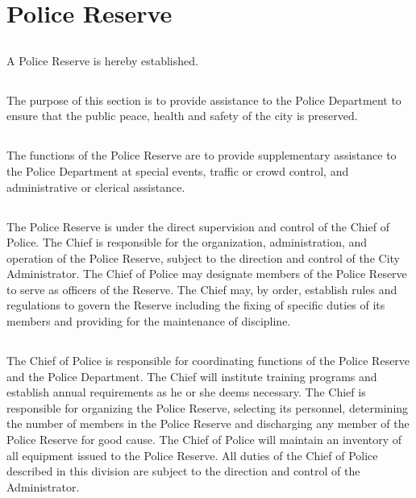 \section{Police Reserve}
\subsection{}
A Police Reserve is hereby established.
\subsection{}
The purpose of this section is to provide assistance to the Police Department to ensure that the public peace, health and safety of the city is preserved.
\subsection{}
The functions of the Police Reserve are to provide supplementary assistance to the Police Department at special events, traffic or crowd control, and administrative or clerical assistance.
\subsection{}
The Police Reserve is under the direct supervision and control of the Chief of Police.  The Chief is responsible for the organization, administration, and operation of the Police Reserve, subject to the direction and control of the City Administrator. The Chief of Police may designate members of the Police Reserve to serve as officers of the Reserve. The Chief may, by order, establish rules and regulations to govern the Reserve including the fixing of specific duties of its members and providing for the maintenance of discipline.
\subsection{}
The Chief of Police is responsible for coordinating functions of the Police Reserve and the Police Department. The Chief will institute training programs and establish annual requirements as he or she deems necessary. The Chief is responsible for organizing the Police Reserve, selecting its personnel, determining the number of members in the Police Reserve and discharging any member of the Police Reserve for good cause. The Chief of Police will maintain an inventory of all equipment issued to the Police Reserve. All duties of the Chief of Police described in this division are subject to the direction and control of the Administrator.
